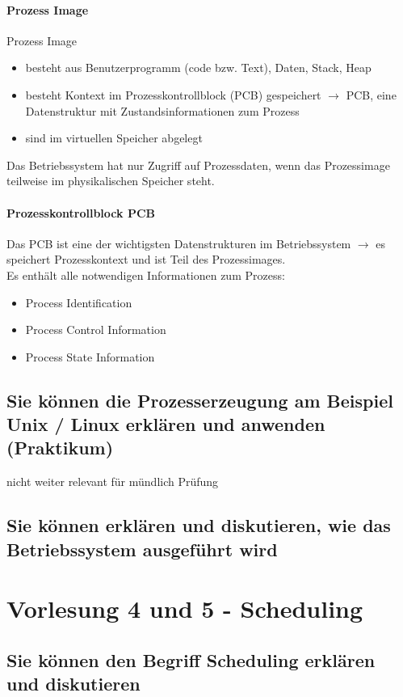 \documentclass{report}
\theoremstyle{definition}
\theoremstyle{example}
\begin{document}
		\subsubsection{Prozess Image}
Prozess Image
\begin{itemize}
	\item besteht aus Benutzerprogramm (code bzw. Text), Daten, Stack, Heap
	\item besteht Kontext im Prozesskontrollblock (PCB) gespeichert $\rightarrow$ PCB, eine Datenstruktur mit Zustandsinformationen zum Prozess
	\item sind im virtuellen Speicher abgelegt
\end{itemize}
Das Betriebssystem hat nur Zugriff auf Prozessdaten, wenn das Prozessimage teilweise im physikalischen Speicher steht.

		\subsubsection{Prozesskontrollblock PCB}
Das PCB ist eine der wichtigsten Datenstrukturen im Betriebssystem $\rightarrow$ es speichert Prozesskontext und ist Teil des Prozessimages. \\
Es enthält alle notwendigen Informationen zum Prozess:
\begin{itemize}
	\item Process Identification
	\item Process Control Information
	\item Process State Information
\end{itemize}

\section{Sie können die Prozesserzeugung am Beispiel Unix / Linux erklären und anwenden (Praktikum)}
nicht weiter relevant für mündlich Prüfung

\section{Sie können erklären und diskutieren, wie das Betriebssystem ausgeführt wird}


\chapter{Vorlesung 4 und 5 - Scheduling}

\section{Sie können den Begriff Scheduling erklären und diskutieren}
\end{document}
